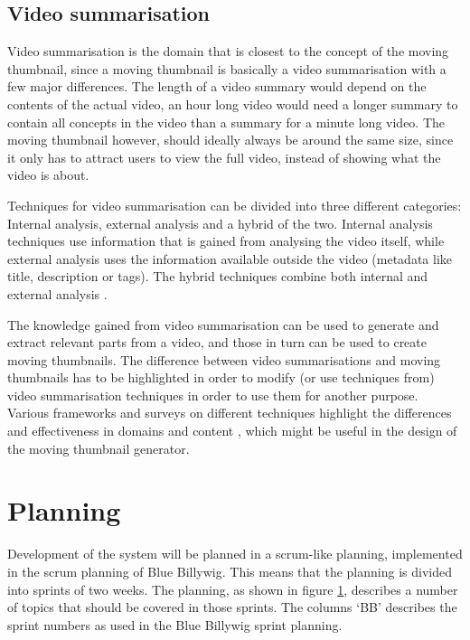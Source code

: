 \documentclass{../resources/acm_proc_article-sp}
\begin{document}
\subsection{Video summarisation}

Video summarisation is the domain that is closest to the concept of the moving thumbnail, since a moving thumbnail is basically a video summarisation with a few major differences. The length of a video summary would depend on the contents of the actual video, an hour long video would need a longer summary to contain all concepts in the video than a summary for a minute long video. The moving thumbnail however, should ideally always be around the same size, since it only has to attract users to view the full video, instead of showing what the video is about.

Techniques for video summarisation can be divided into three different categories: Internal analysis, external analysis and a hybrid of the two. Internal analysis techniques use information that is gained from analysing the video itself, while external analysis uses the information available outside the video (metadata like title, description or tags). The hybrid techniques combine both internal and external analysis \cite{Money:2008fn}.

The knowledge gained from video summarisation can be used to generate and extract relevant parts from a video, and those in turn can be used to create moving thumbnails. The difference between video summarisations and moving thumbnails has to be highlighted in order to modify (or use techniques from) video summarisation techniques in order to use them for another purpose. Various frameworks and surveys on different techniques highlight the differences and effectiveness in domains and content \cite{Money:2008fn,Ajmal:2012hi}, which might be useful in the design of the moving thumbnail generator.

\section{Planning}

Development of the system will be planned in a scrum-like planning, implemented in the scrum planning of Blue Billywig. This means that the planning is divided into sprints of two weeks. The planning, as shown in figure \ref{}, describes a number of topics that should be covered in those sprints. The columns `BB' describes the sprint numbers as used in the Blue Billywig sprint planning.
\end{document}
